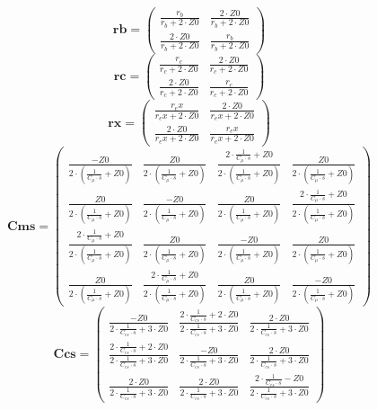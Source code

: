 \[ \mathbf{rb}=\left(\begin{smallmatrix} \frac{r_b}{r_b+2\cdot Z0} &
\frac{2\cdot Z0}{r_b+2\cdot Z0} \\ \frac{2\cdot Z0}{r_b+2\cdot Z0} &
\frac{r_b}{r_b+2\cdot Z0} \end{smallmatrix}\right) \]
\[ \mathbf{rc}=\left(\begin{smallmatrix} \frac{r_c}{r_c+2\cdot Z0} &
\frac{2\cdot Z0}{r_c+2\cdot Z0} \\ \frac{2\cdot Z0}{r_c+2\cdot Z0} &
\frac{r_c}{r_c+2\cdot Z0} \end{smallmatrix}\right) \]
\[ \mathbf{rx}=\left(\begin{smallmatrix} \frac{r_ex}{r_ex+2\cdot Z0} &
\frac{2\cdot Z0}{r_ex+2\cdot Z0} \\ \frac{2\cdot Z0}{r_ex+2\cdot Z0} &
\frac{r_ex}{r_ex+2\cdot Z0} \end{smallmatrix}\right) \]
\[ \mathbf{Cms}=\left(\begin{smallmatrix} \frac{-Z0}{2\cdot
\left(\frac{1}{C_{\mu}\cdot s}+Z0\right)} & \frac{Z0}{2\cdot
\left(\frac{1}{C_{\mu}\cdot s}+Z0\right)} & \frac{2\cdot
\frac{1}{C_{\mu}\cdot s}+Z0}{2\cdot \left(\frac{1}{C_{\mu}\cdot
s}+Z0\right)} & \frac{Z0}{2\cdot \left(\frac{1}{C_{\mu}\cdot
s}+Z0\right)} \\ \frac{Z0}{2\cdot \left(\frac{1}{C_{\mu}\cdot
s}+Z0\right)} & \frac{-Z0}{2\cdot \left(\frac{1}{C_{\mu}\cdot
s}+Z0\right)} & \frac{Z0}{2\cdot \left(\frac{1}{C_{\mu}\cdot
s}+Z0\right)} & \frac{2\cdot \frac{1}{C_{\mu}\cdot s}+Z0}{2\cdot
\left(\frac{1}{C_{\mu}\cdot s}+Z0\right)} \\ \frac{2\cdot
\frac{1}{C_{\mu}\cdot s}+Z0}{2\cdot \left(\frac{1}{C_{\mu}\cdot
s}+Z0\right)} & \frac{Z0}{2\cdot \left(\frac{1}{C_{\mu}\cdot
s}+Z0\right)} & \frac{-Z0}{2\cdot \left(\frac{1}{C_{\mu}\cdot
s}+Z0\right)} & \frac{Z0}{2\cdot \left(\frac{1}{C_{\mu}\cdot
s}+Z0\right)} \\ \frac{Z0}{2\cdot \left(\frac{1}{C_{\mu}\cdot
s}+Z0\right)} & \frac{2\cdot \frac{1}{C_{\mu}\cdot s}+Z0}{2\cdot
\left(\frac{1}{C_{\mu}\cdot s}+Z0\right)} & \frac{Z0}{2\cdot
\left(\frac{1}{C_{\mu}\cdot s}+Z0\right)} & \frac{-Z0}{2\cdot
\left(\frac{1}{C_{\mu}\cdot s}+Z0\right)} \end{smallmatrix}\right) \]
\[ \mathbf{Ccs}=\left(\begin{smallmatrix} \frac{-Z0}{2\cdot
\frac{1}{C_{cs}\cdot s}+3\cdot Z0} & \frac{2\cdot \frac{1}{C_{cs}\cdot
s}+2\cdot Z0}{2\cdot \frac{1}{C_{cs}\cdot s}+3\cdot Z0} & \frac{2\cdot
Z0}{2\cdot \frac{1}{C_{cs}\cdot s}+3\cdot Z0} \\ \frac{2\cdot
\frac{1}{C_{cs}\cdot s}+2\cdot Z0}{2\cdot \frac{1}{C_{cs}\cdot
s}+3\cdot Z0} & \frac{-Z0}{2\cdot \frac{1}{C_{cs}\cdot s}+3\cdot Z0} &
\frac{2\cdot Z0}{2\cdot \frac{1}{C_{cs}\cdot s}+3\cdot Z0} \\
\frac{2\cdot Z0}{2\cdot \frac{1}{C_{cs}\cdot s}+3\cdot Z0} &
\frac{2\cdot Z0}{2\cdot \frac{1}{C_{cs}\cdot s}+3\cdot Z0} &
\frac{2\cdot \frac{1}{C_{cs}\cdot s}-Z0}{2\cdot \frac{1}{C_{cs}\cdot
s}+3\cdot Z0} \end{smallmatrix}\right) \]
